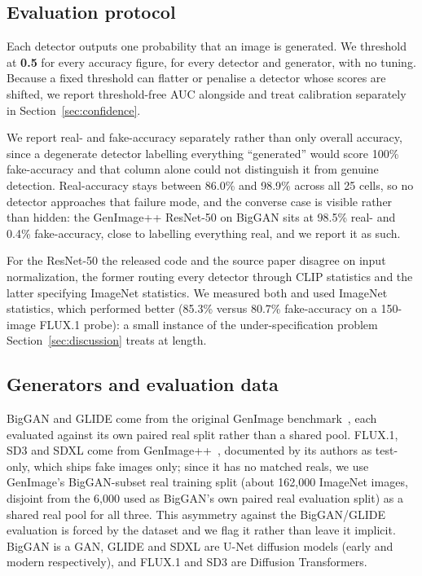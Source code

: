 \documentclass[3p,times,procedia]{elsarticle}
\begin{document}
\subsection{Evaluation protocol}
\label{sec:methods-protocol}

Each detector outputs one probability that an image is generated. We
threshold at \textbf{0.5} for every accuracy figure, for every detector and
generator, with no tuning. Because a fixed threshold can flatter or
penalise a detector whose scores are shifted, we report threshold-free AUC
alongside and treat calibration separately in
Section~\ref{sec:confidence}.

We report real- and fake-accuracy separately rather than only overall
accuracy, since a degenerate detector labelling everything ``generated''
would score 100\% fake-accuracy and that column alone could not distinguish
it from genuine detection. Real-accuracy stays between 86.0\% and 98.9\%
across all 25 cells, so no detector approaches that failure mode, and the
converse case is visible rather than hidden: the GenImage++ ResNet-50 on
BigGAN sits at 98.5\% real- and 0.4\% fake-accuracy, close to labelling
everything real, and we report it as such.

For the ResNet-50 the released code and the source paper disagree on input
normalization, the former routing every detector through CLIP statistics
and the latter specifying ImageNet statistics. We measured both and used
ImageNet statistics, which performed better (85.3\% versus 80.7\%
fake-accuracy on a 150-image FLUX.1 probe): a small instance of the
under-specification problem Section~\ref{sec:discussion} treats at
length.

\subsection{Generators and evaluation data}

BigGAN and GLIDE come from the original GenImage
benchmark~\cite{genimage2023}, each evaluated against its own paired real
split rather than a shared pool. FLUX.1, SD3 and SDXL come from
GenImage++~\cite{zhou2025omat}, documented by its authors as test-only,
which ships fake images only; since it has no matched reals, we use
GenImage's BigGAN-subset real training split (about 162{,}000 ImageNet
images, disjoint from the 6{,}000 used as BigGAN's own paired real
evaluation split) as a shared real pool for all three. This asymmetry
against the BigGAN/GLIDE evaluation is forced by the dataset and we flag it
rather than leave it implicit. BigGAN is a GAN, GLIDE and SDXL are
U-Net diffusion models (early and modern respectively), and FLUX.1 and SD3
are Diffusion Transformers.
\end{document}
